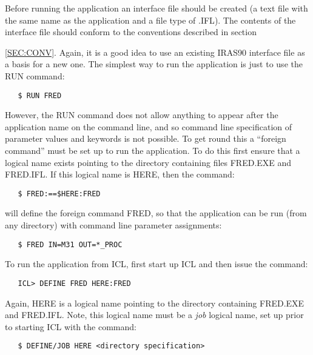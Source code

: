 Before running the application an interface file should be created 
(a text file with the same name as the application and a file type 
of {\small .IFL}). The contents of the interface file should conform to the 
conventions described in section {\ref{SEC:CONV}. Again, it is a good idea to 
use an existing {\small IRAS90} interface file as a basis for a new one. The 
simplest way to run the application is just to use the {\small RUN} command:

\small
\begin{verbatim}
   $ RUN FRED
\end{verbatim}
\normalsize

However, the {\small RUN} command does not allow anything to appear after the 
application name on the command line, and so command line specification of 
parameter values and keywords is not possible. To get round this a ``foreign 
command'' must be set up to run the application. To do this first ensure that a 
logical name exists pointing to the directory containing files {\small FRED.EXE} 
and {\small FRED.IFL}. If this logical name is {\small HERE}, then the command:

\small
\begin{verbatim}
   $ FRED:==$HERE:FRED
\end{verbatim}
\normalsize

will define the foreign command {\small FRED}, so that the application can 
be run (from any directory) with command line parameter assignments:

\small
\begin{verbatim}
   $ FRED IN=M31 OUT=*_PROC
\end{verbatim}
\normalsize

To run the application from {\small ICL}, first start up {\small ICL} and then 
issue the command:

\small
\begin{verbatim}
   ICL> DEFINE FRED HERE:FRED
\end{verbatim}
\normalsize

Again, {\small HERE} is a logical name pointing to the directory containing
{\small FRED.EXE} and {\small FRED.IFL}. Note, this logical name must be a {\em 
job} logical name, set up prior to starting {\small ICL} with the command:

\small
\begin{verbatim}
   $ DEFINE/JOB HERE <directory specification>
\end{verbatim}
\normalsize

}
